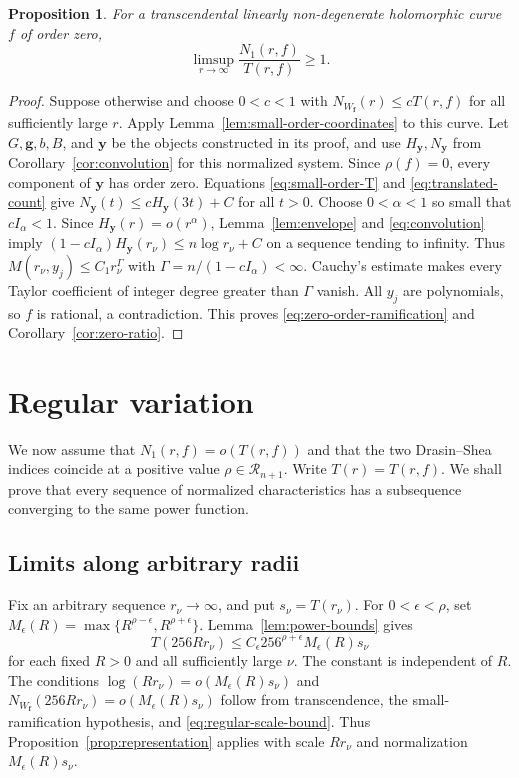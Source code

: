 \documentclass[11pt,letterpaper,reqno]{amsart}
\newtheorem{prop}[thm]{Proposition}
\theoremstyle{remark}
\numberwithin{equation}{section}
\newcommand{\fv}{\bm f}
\newcommand{\gv}{\bm g}
\newcommand{\yv}{\bm y}
\newcommand{\Gn}{\mathcal R_{n+1}}
\begin{document}
\begin{prop}\label{prop:zero-order-ramification}
For a transcendental linearly non-degenerate holomorphic curve $f$ of order
zero,
\begin{equation}\label{eq:zero-order-ramification}
 \limsup_{r\to\infty}\frac{N_1(r,f)}{T(r,f)}\ge1.
\end{equation}
\end{prop}
\begin{proof}
Suppose otherwise and choose $0<c<1$ with
$N_{W_{\fv}}(r)\le cT(r,f)$ for all sufficiently large $r$.
Apply Lemma~\ref{lem:small-order-coordinates} to this curve. Let
$G,\gv,b,B$, and $\yv$ be the objects constructed in its proof, and
use $H_{\yv},N_{\yv}$ from Corollary~\ref{cor:convolution} for this
normalized system. Since $\rho(f)=0$, every component of $\yv$ has order
zero. Equations
\eqref{eq:small-order-T} and \eqref{eq:translated-count} give
$N_{\yv}(t)\le cH_{\yv}(3t)+C$ for all $t>0$.
Choose $0<\alpha<1$ so small that $cI_\alpha<1$.
Since $H_{\yv}(r)=o(r^\alpha)$, Lemma~\ref{lem:envelope} and
\eqref{eq:convolution} imply
$(1-cI_\alpha)H_{\yv}(r_\nu)\le n\log r_\nu+C$ on a sequence tending
to infinity. Thus $M(r_\nu,y_j)\le C_1r_\nu^\Gamma$ with
$\Gamma=n/(1-cI_\alpha)<\infty$.
Cauchy's estimate makes every Taylor coefficient of integer degree greater
than $\Gamma$ vanish. All $y_j$ are polynomials, so $f$ is rational, a
contradiction. This proves \eqref{eq:zero-order-ramification} and
Corollary~\ref{cor:zero-ratio}.
\end{proof}

\section{Regular variation}\label{sec:regular}

We now assume that $N_1(r,f)=o(T(r,f))$ and that the two Drasin--Shea
indices coincide at a positive value $\rho\in\Gn$. Write $T(r)=T(r,f)$.
We shall prove that every sequence of normalized characteristics has a
subsequence converging to the same power function.

\subsection{Limits along arbitrary radii}\label{sec:arbitrary-limits}

Fix an arbitrary sequence $r_\nu\to\infty$, and put $s_\nu=T(r_\nu)$.
For $0<\epsilon<\rho$, set
$M_\epsilon(R)=\max\{R^{\rho-\epsilon},R^{\rho+\epsilon}\}$.
Lemma~\ref{lem:power-bounds} gives
\begin{equation}\label{eq:regular-scale-bound}
 T(256Rr_\nu)\leq C_\epsilon256^{\rho+\epsilon}
 M_\epsilon(R)s_\nu
\end{equation}
for each fixed $R>0$ and all sufficiently large $\nu$.
The constant is independent of $R$. The conditions
$\log(Rr_\nu)=o(M_\epsilon(R)s_\nu)$ and
$N_{W_{\fv}}(256Rr_\nu)=o(M_\epsilon(R)s_\nu)$ follow from
transcendence, the small-ramification hypothesis, and
\eqref{eq:regular-scale-bound}. Thus Proposition~\ref{prop:representation}
applies with scale $Rr_\nu$ and normalization $M_\epsilon(R)s_\nu$.
\end{document}

